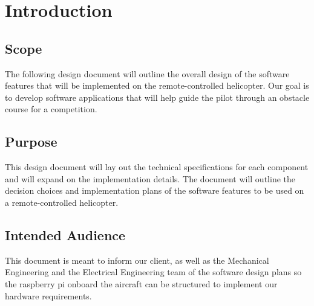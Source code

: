 \documentclass[onecolumn, draftclsnofoot, 10pt, compsoc]{IEEEtran}
\begin{document}
\newpage
\section{Introduction}
\subsection{Scope}
The following design document will outline the overall design of the software features that will be implemented on the remote-controlled helicopter. Our goal is to develop software applications that will help guide the pilot through an obstacle course for a competition.
\subsection{Purpose}
This design document will lay out the technical specifications for each component and will expand on the implementation details. The document will outline the decision choices and implementation plans of the software features to be used on a remote-controlled helicopter.

\subsection{Intended Audience}
This document is meant to inform our client, as well as the Mechanical Engineering and the Electrical Engineering team of the software design plans so the raspberry pi onboard the aircraft can be structured to implement our hardware requirements.
\end{document}
